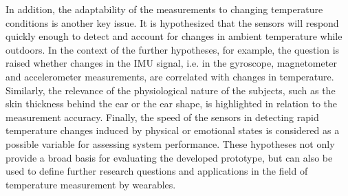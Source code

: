 In addition, the adaptability of the measurements to changing temperature conditions is another key issue. 
It is hypothesized that the sensors will respond quickly enough to detect and account for changes in ambient temperature while outdoors.
In the context of the further hypotheses, for example, the question is raised whether changes in the IMU signal, i.e. in the gyroscope, magnetometer and accelerometer measurements, are correlated with changes in temperature. Similarly, the relevance of the physiological nature of the subjects, such as the skin thickness behind the ear or the ear shape, is highlighted in relation to the measurement accuracy. 
Finally, the speed of the sensors in detecting rapid temperature changes induced by physical or emotional states is considered as a possible variable for assessing system performance.
These hypotheses not only provide a broad basis for evaluating the developed prototype, but can also be used to define further research questions and applications in the field of temperature measurement by wearables.

